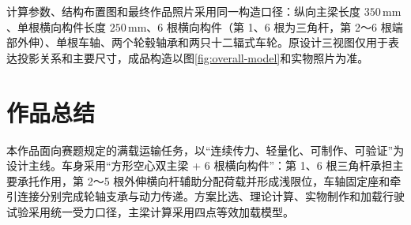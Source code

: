 \documentclass[UTF8,a4paper,12pt,fontset=none]{ctexart}
\numberwithin{equation}{section}
\numberwithin{figure}{section}
\numberwithin{table}{section}
\newcommand{\mm}{\,\mathrm{mm}}
\begin{document}
计算参数、结构布置图和最终作品照片采用同一构造口径：纵向主梁长度 $350\mm$、单根横向构件长度 $250\mm$、6 根横向构件（第 1、6 根为三角杆，第 2～6 根端部外伸）、单根车轴、两个轮毂轴承和两只十二辐式车轮。原设计三视图仅用于表达投影关系和主要尺寸，成品构造以图\ref{fig:overall-model}和实物照片为准。

\newpage
\section*{作品总结}
\thispagestyle{fancy}
本作品面向赛题规定的满载运输任务，以“连续传力、轻量化、可制作、可验证”为设计主线。车身采用“方形空心双主梁 + 6 根横向构件”：第 1、6 根三角杆承担主要承托作用，第 2～5 根外伸横向杆辅助分配荷载并形成浅限位，车轴固定座和牵引连接分别完成轮轴支承与动力传递。方案比选、理论计算、实物制作和加载行驶试验采用统一受力口径，主梁计算采用四点等效加载模型。
\end{document}
